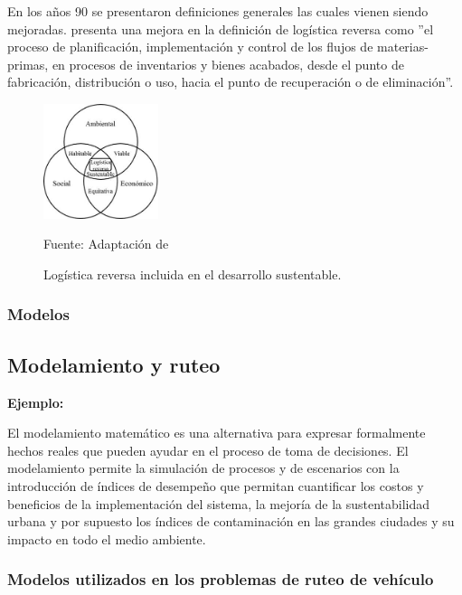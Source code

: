 En los años 90 se presentaron definiciones generales las cuales vienen siendo mejoradas. \cite{Dekker} presenta una mejora en la definición de logística reversa como  ”el proceso de planificación, implementación y control de los flujos de materias-primas, en procesos de inventarios y bienes acabados, desde el punto de fabricación, distribución o uso, hacia el punto de recuperación o de eliminación”. 
\begin{figure}[ht]
\begin{center}
\includegraphics[width=0.3\textwidth]{Figura1}
\end{center}
\begin{center}
\vskip -0.5cm
\caption{\small{Logística reversa incluida en el desarrollo sustentable.}}
{\small{Fuente: Adaptación de \cite{Tanguay}}}
\end{center}
\end{figure}


\subsubsection{Modelos}

\subsection{Modelamiento y ruteo }

{\bf Ejemplo:}\par

El modelamiento matemático es una alternativa para expresar formalmente hechos reales que pueden ayudar en el proceso de toma de decisiones. El modelamiento permite la simulación de procesos  y de escenarios con la introducción de índices de desempeño que permitan cuantificar los costos y beneficios de la implementación del sistema, la mejoría de la sustentabilidad urbana y por supuesto los índices de contaminación en las grandes ciudades y su impacto en todo el medio ambiente. 

\subsubsection{Modelos utilizados en los problemas de ruteo de vehículo }


